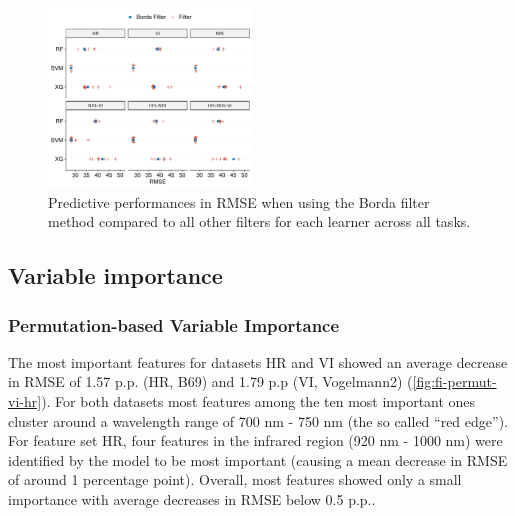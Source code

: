 \documentclass[letterpaper, peerreview, draftcls]{IEEEtran}
\begin{document}
\begin{figure} [t!]
	\centering
	\begin{center}
		\includegraphics[width=0.48\textwidth] {filter-effect-all-vs-borda-filter-1.pdf}
		\caption{Predictive performances in RMSE when using the Borda filter method compared to all other filters for each learner across all tasks.}\label{fig:filter-effects-borda}
	\end{center}
\end{figure}

\subsection{Variable importance}

\subsubsection{Permutation-based Variable Importance}


The most important features for datasets HR and VI showed an average decrease in RMSE of 1.57 p.p. (HR, B69) and 1.79 p.p (VI, Vogelmann2) (\autoref{fig:fi-permut-vi-hr}).
For both datasets most features among the ten most important ones cluster around a wavelength range of 700 nm - 750 nm (the so called \enquote{red edge}).
For feature set HR, four features in the infrared region (920 nm - 1000 nm) were identified by the model to be most important (causing a mean decrease in RMSE of around 1 percentage point).
Overall, most features showed only a small importance with average decreases in RMSE below 0.5 p.p..
\end{document}
